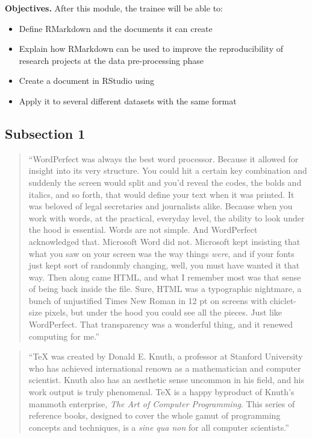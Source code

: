 \documentclass[]{tufte-book}
\providecommand{\tightlist}{%
  \setlength{\itemsep}{0pt}\setlength{\parskip}{0pt}}
\begin{document}
\textbf{Objectives.} After this module, the trainee will be able to:

\begin{itemize}
\tightlist
\item
  Define RMarkdown and the documents it can create
\item
  Explain how RMarkdown can be used to improve the reproducibility of research
  projects at the data pre-processing phase
\item
  Create a document in RStudio using
\item
  Apply it to several different datasets with the same format
\end{itemize}

\hypertarget{subsection-1-14}{%
\subsection{Subsection 1}\label{subsection-1-14}}

\begin{quote}
``WordPerfect was always the best word processor. Because it allowed for insight into
its very structure. You could hit a certain key combination and suddenly the screen
would split and you'd reveal the codes, the bolds and italics, and so forth,
that would define your text when it was printed. It was beloved of legal secretaries
and journalists alike. Because when you work with words, at the practical, everyday
level, the ability to look under the hood is essential. Words are not simple. And
WordPerfect acknowledged that. Microsoft Word did not. Microsoft kept insisting that
what you saw on your screen was the way things \emph{were}, and if your fonts just kept
sort of randonmly changing, well, you must have wanted it that way. Then along came
HTML, and what I remember most was that sense of being back inside the file. Sure,
HTML was a typographic nightmare, a bunch of unjustified Times New Roman in 12 pt on
screens with chiclet-size pixels, but under the hood you could see all the pieces.
Just like WordPerfect. That transparency was a wonderful thing, and it renewed
computing for me.'' \citep{ford2015on}
\end{quote}

\begin{quote}
``TeX was created by Donald E. Knuth, a professor at Stanford University who has
achieved international renown as a mathematician and computer scientist.
Knuth also has an aesthetic sense uncommon in his field, and his work output is
truly phenomenal. TeX is a happy byproduct of Knuth's mammoth enterprise,
\emph{The Art of Computer Programming}. This series of reference books, designed
to cover the whole gamut of programming concepts and techniques, is a
\emph{sine qua non} for all computer scientists.'' \citep{seroul2012beginner}
\end{quote}
\end{document}
